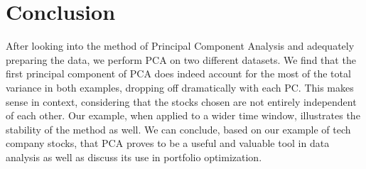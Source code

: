 \documentclass{article}
\begin{document}
\section{Conclusion}
After looking into the method of Principal Component Analysis and adequately preparing the data, we perform PCA on two different datasets. We find that the first principal component of PCA does indeed account for the most of the total variance in both examples, dropping off dramatically with each PC. This makes sense in context, considering that the stocks chosen are not entirely independent of each other. Our example, when applied to a wider time window, illustrates the stability of the method as well. We can conclude, based on our example of tech company stocks, that PCA proves to be a useful and valuable tool in data analysis as well as discuss its use in portfolio optimization. 
\end{document}
